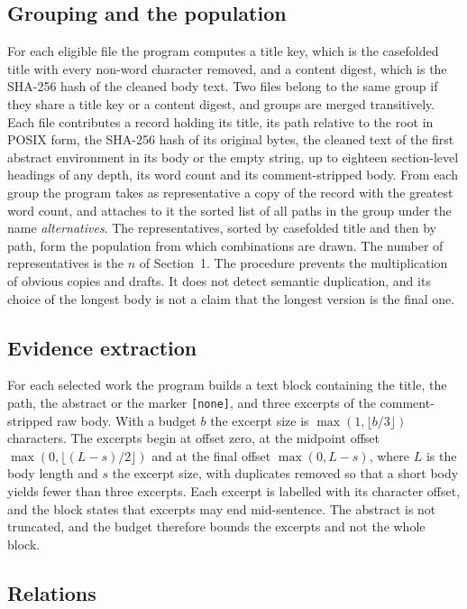 \documentclass[11pt]{article}
\begin{document}
\subsection{Grouping and the population}

For each eligible file the program computes a title key, which is the casefolded title with every non-word character removed, and a content digest, which is the SHA-256 hash of the cleaned body text. Two files belong to the same group if they share a title key or a content digest, and groups are merged transitively. Each file contributes a record holding its title, its path relative to the root in POSIX form, the SHA-256 hash of its original bytes, the cleaned text of the first abstract environment in its body or the empty string, up to eighteen section-level headings of any depth, its word count and its comment-stripped body. From each group the program takes as representative a copy of the record with the greatest word count, and attaches to it the sorted list of all paths in the group under the name \emph{alternatives}. The representatives, sorted by casefolded title and then by path, form the population from which combinations are drawn. The number of representatives is the $n$ of Section~1. The procedure prevents the multiplication of obvious copies and drafts. It does not detect semantic duplication, and its choice of the longest body is not a claim that the longest version is the final one.

\subsection{Evidence extraction}

For each selected work the program builds a text block containing the title, the path, the abstract or the marker \texttt{[none]}, and three excerpts of the comment-stripped raw body. With a budget $b$ the excerpt size is $\max(1,\lfloor b/3\rfloor)$ characters. The excerpts begin at offset zero, at the midpoint offset $\max(0,\lfloor(L-s)/2\rfloor)$ and at the final offset $\max(0,L-s)$, where $L$ is the body length and $s$ the excerpt size, with duplicates removed so that a short body yields fewer than three excerpts. Each excerpt is labelled with its character offset, and the block states that excerpts may end mid-sentence. The abstract is not truncated, and the budget therefore bounds the excerpts and not the whole block.

\subsection{Relations}
\end{document}
